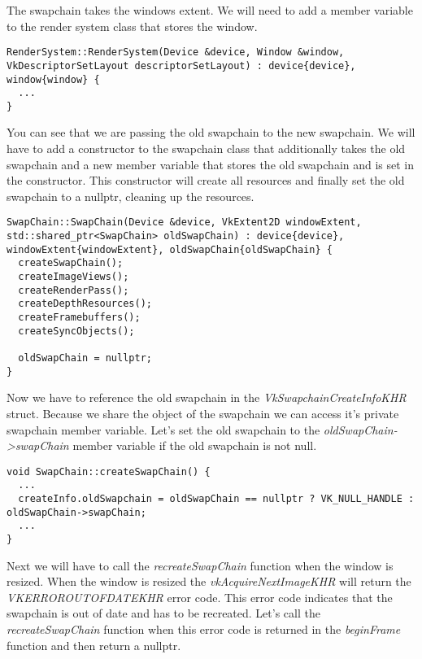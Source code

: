 \documentclass[12pt]{report} \usepackage{preamble}
\begin{document}
The swapchain takes the windows extent. We will need to add a member variable to the render system class that stores the window.

\begin{lstlisting}[Language=C++]
RenderSystem::RenderSystem(Device &device, Window &window, VkDescriptorSetLayout descriptorSetLayout) : device{device}, window{window} {
  ...
}
\end{lstlisting}

You can see that we are passing the old swapchain to the new swapchain. We will have to add a constructor to the swapchain class that additionally takes the old swapchain
and a new member variable that stores the old swapchain and is set in the constructor. This constructor will create all resources and finally set the old swapchain to a nullptr,
cleaning up the resources.

\begin{lstlisting}[Language=C++]
SwapChain::SwapChain(Device &device, VkExtent2D windowExtent, std::shared_ptr<SwapChain> oldSwapChain) : device{device}, windowExtent{windowExtent}, oldSwapChain{oldSwapChain} {
  createSwapChain();
  createImageViews();
  createRenderPass();
  createDepthResources();
  createFramebuffers();
  createSyncObjects();

  oldSwapChain = nullptr;
}
\end{lstlisting}

Now we have to reference the old swapchain in the \textit{VkSwapchainCreateInfoKHR} struct. Because we share the object of the swapchain we can access it's
private swapchain member variable. Let's set the old swapchain to the \textit{oldSwapChain->swapChain} member variable if the old swapchain is not null.

\begin{lstlisting}[Language=C++]
void SwapChain::createSwapChain() {
  ...
  createInfo.oldSwapchain = oldSwapChain == nullptr ? VK_NULL_HANDLE : oldSwapChain->swapChain;
  ...
}
\end{lstlisting}

Next we will have to call the \textit{recreateSwapChain} function when the window is resized. When the window is resized the \textit{vkAcquireNextImageKHR}
will return the \\ \textit{VK\textunderscore ERROR\textunderscore OUT\textunderscore OF\textunderscore DATE\textunderscore KHR} error code. This error code
indicates that the swapchain is out of date and has to be recreated. Let's call the \textit{recreateSwapChain} function when this error code is returned
in the \textit{beginFrame} function and then return a nullptr.
\end{document}
